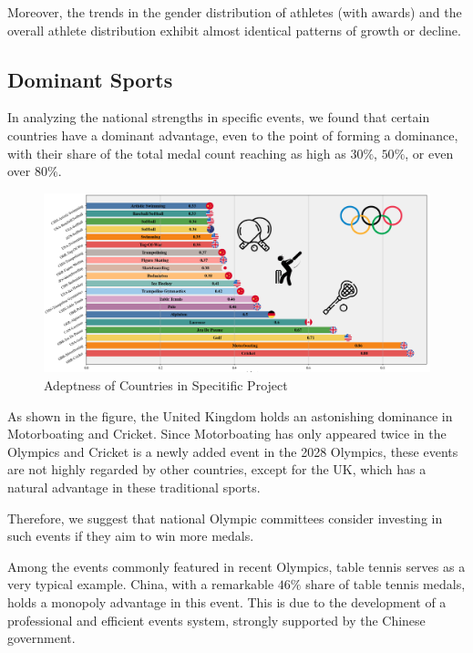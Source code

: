 \documentclass[12pt]{article}  %
\begin{document}
Moreover, the trends in the gender distribution of athletes (with awards) and the overall athlete distribution exhibit almost identical patterns of growth or decline.










\subsection{Dominant Sports}

In analyzing the national strengths in specific events, we found that certain countries have a dominant advantage, even to the point of forming a dominance, with their share of the total medal count reaching as high as \( 30\% \), \( 50\% \), or even over \( 80\% \).



\begin{figure}[htbp]
	\centering
	\includegraphics[width=16cm]{img/Monopolized Sports.png}
	\caption{Adeptness of Countries in Specitific Project}
	\label{fig:aa}
\end{figure}

As shown in the figure, the United Kingdom holds an astonishing dominance in Motorboating and Cricket. Since Motorboating has only appeared twice in the Olympics and Cricket is a newly added event in the 2028 Olympics, these events are not highly regarded by other countries, except for the UK, which has a natural advantage in these traditional sports.

Therefore, we suggest that national Olympic committees consider investing in such events if they aim to win more medals.


Among the events commonly featured in recent Olympics, table tennis serves as a very typical example. China, with a remarkable \( 46\% \) share of table tennis medals, holds a monopoly advantage in this event. This is due to the development of a professional and efficient events system, strongly supported by the Chinese government.
\end{document}
